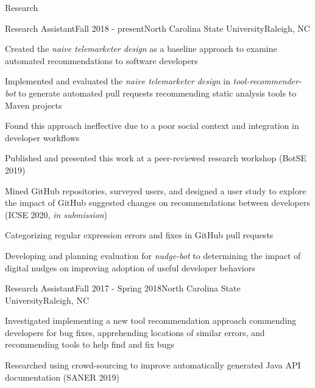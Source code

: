 \documentclass{resume} %
\begin{document}
\begin{rSection}{Research}


\begin{rSubsection}{Research Assistant}{Fall 2018 - present}{North Carolina State University}{Raleigh, NC}
\item Created the \textit{naive telemarketer design} as a baseline approach to examine automated recommendations to software developers
\item Implemented and evaluated the \textit{naive telemarketer design} in \textsl{tool-recommender-bot} to generate automated pull requests recommending static analysis tools to Maven projects 
\item Found this approach ineffective due to a poor social context and integration in developer workflows
\item Published and presented this work at a peer-reviewed research workshop (BotSE 2019)
\item Mined GitHub repositories, surveyed users, and designed a user study to explore the impact of GitHub suggested changes on recommendations between developers (ICSE 2020, \textit{in submission})
\item Categorizing regular expression errors and fixes in GitHub pull requests
\item Developing and planning evaluation for \textsl{nudge-bot} to determining the impact of digital nudges on improving adoption of useful developer behaviors 
\end{rSubsection}
\vspace{-5pt}

\begin{rSubsection}{Research Assistant}{Fall 2017 - Spring 2018}{North Carolina State University}{Raleigh, NC}
\item Investigated implementing a new tool recommendation approach commending developers for bug fixes, apprehending locations of similar errors, and recommending tools to help find and fix bugs
\item Researched using crowd-sourcing to improve automatically generated Java API documentation (SANER 2019)
\end{rSubsection}
\vspace{-5pt}


\end{rSection}
\end{document}
